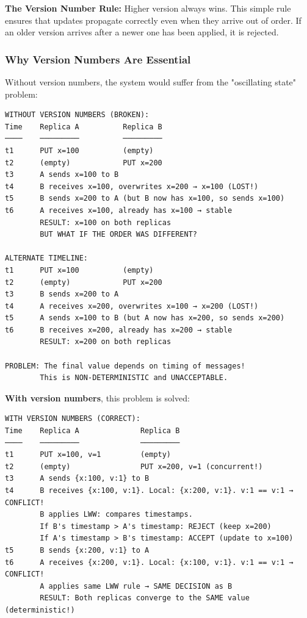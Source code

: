 \documentclass[10pt,a4paper]{article}
\begin{document}
\textbf{The Version Number Rule:} Higher version always wins. This simple rule ensures that updates propagate correctly even when they arrive out of order. If an older version arrives after a newer one has been applied, it is rejected.

\subsubsection{Why Version Numbers Are Essential}

Without version numbers, the system would suffer from the "oscillating state" problem:

\begin{verbatim}
WITHOUT VERSION NUMBERS (BROKEN):
Time    Replica A          Replica B
────    ─────────          ─────────
t1      PUT x=100          (empty)
t2      (empty)            PUT x=200
t3      A sends x=100 to B
t4      B receives x=100, overwrites x=200 → x=100 (LOST!)
t5      B sends x=200 to A (but B now has x=100, so sends x=100)
t6      A receives x=100, already has x=100 → stable
        RESULT: x=100 on both replicas
        BUT WHAT IF THE ORDER WAS DIFFERENT?
        
ALTERNATE TIMELINE:
t1      PUT x=100          (empty)
t2      (empty)            PUT x=200
t3      B sends x=200 to A
t4      A receives x=200, overwrites x=100 → x=200 (LOST!)
t5      A sends x=100 to B (but A now has x=200, so sends x=200)
t6      B receives x=200, already has x=200 → stable
        RESULT: x=200 on both replicas

PROBLEM: The final value depends on timing of messages!
        This is NON-DETERMINISTIC and UNACCEPTABLE.
\end{verbatim}

\textbf{With version numbers}, this problem is solved:

\begin{verbatim}
WITH VERSION NUMBERS (CORRECT):
Time    Replica A              Replica B
────    ─────────              ─────────
t1      PUT x=100, v=1         (empty)
t2      (empty)                PUT x=200, v=1 (concurrent!)
t3      A sends {x:100, v:1} to B
t4      B receives {x:100, v:1}. Local: {x:200, v:1}. v:1 == v:1 → CONFLICT!
        B applies LWW: compares timestamps.
        If B's timestamp > A's timestamp: REJECT (keep x=200)
        If A's timestamp > B's timestamp: ACCEPT (update to x=100)
t5      B sends {x:200, v:1} to A
t6      A receives {x:200, v:1}. Local: {x:100, v:1}. v:1 == v:1 → CONFLICT!
        A applies same LWW rule → SAME DECISION as B
        RESULT: Both replicas converge to the SAME value (deterministic!)
\end{verbatim}
\end{document}
